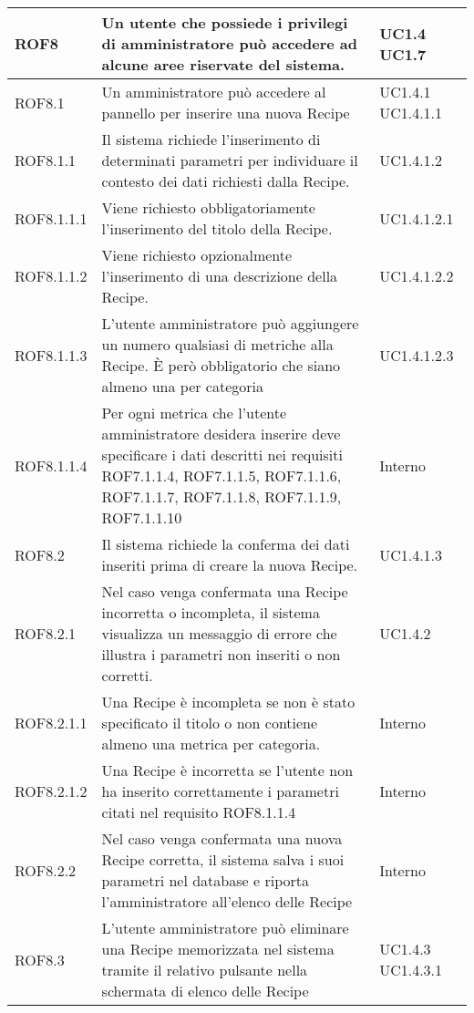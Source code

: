 \begin{center}
\begin{longtable}{| p{2.5cm} | p{8cm} | p{2cm} |}
		ROF8  &  Un utente che possiede i privilegi di amministratore può accedere ad alcune aree riservate del sistema.  &  UC1.4 \newline UC1.7 \\
		\hline
		ROF8.1  &  Un amministratore può accedere al pannello per inserire una nuova Recipe  &  UC1.4.1 \newline UC1.4.1.1 \\
		\hline
		ROF8.1.1  &  Il sistema richiede l'inserimento di determinati parametri per individuare il contesto dei dati richiesti dalla Recipe.  &  UC1.4.1.2 \\
		\hline
		ROF8.1.1.1  &  Viene richiesto obbligatoriamente l'inserimento del titolo della Recipe.  &  UC1.4.1.2.1 \\
		\hline
		ROF8.1.1.2  &  Viene richiesto opzionalmente l'inserimento di una descrizione della Recipe.  &  UC1.4.1.2.2 \\
		\hline
		ROF8.1.1.3  &  L'utente amministratore può aggiungere un numero qualsiasi di metriche alla Recipe. È però obbligatorio che siano almeno una per categoria  &  UC1.4.1.2.3 \\
		\hline
		ROF8.1.1.4  &  Per ogni metrica che l'utente amministratore desidera inserire deve specificare i dati descritti nei requisiti ROF7.1.1.4, ROF7.1.1.5, ROF7.1.1.6, ROF7.1.1.7, ROF7.1.1.8, ROF7.1.1.9, ROF7.1.1.10  &  Interno \\
		\hline
		ROF8.2  &  Il sistema richiede la conferma dei dati inseriti prima di creare la nuova Recipe.  &  UC1.4.1.3 \\
		\hline
		ROF8.2.1  &  Nel caso venga confermata una Recipe incorretta o incompleta, il sistema visualizza un messaggio di errore che illustra i parametri non inseriti o non corretti. &  UC1.4.2 \\
		\hline
		ROF8.2.1.1  &  Una Recipe è incompleta se non è stato specificato il titolo o non contiene almeno una metrica per categoria. &  Interno \\
		\hline
		ROF8.2.1.2  &  Una Recipe è incorretta se l'utente non ha inserito correttamente i parametri citati nel requisito ROF8.1.1.4 &  Interno \\
		\hline
		ROF8.2.2  &  Nel caso venga confermata  una nuova Recipe corretta, il sistema salva i suoi parametri nel database e riporta l'amministratore all'elenco delle Recipe  &  Interno \\
		\hline
		ROF8.3  &  L'utente amministratore può eliminare una Recipe memorizzata nel sistema tramite il relativo pulsante nella schermata di elenco delle Recipe  &  UC1.4.3 \newline UC1.4.3.1  \\

\end{longtable}
\end{center}
